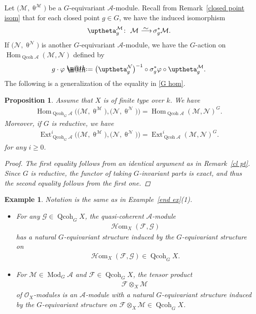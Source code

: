 \documentclass[10pt,a4paper]{amsart}
\makeatletter
\newtheorem{exa}[dfn]{Example}
\newtheorem{prop}[dfn]{Proposition}
\newcommand*{\defeq}{\mathrel{\rlap{%
 \raisebox{0.3ex}{$\m@th\cdot$}}%
 \raisebox{-0.3ex}{$\m@th\cdot$}}%
 =}
\numberwithin{equation}{section}
\newcommand{\Hom}{\operatorname{Hom}}
\newcommand{\cHom}{\operatorname{{\mathcal H}om}}
\newcommand{\Ext}{\operatorname{Ext}}
\newcommand{\Qcoh}{\operatorname{Qcoh}}
\newcommand{\Mod}{\operatorname{Mod}}
\newcommand{\cA}{\mathcal{A}}
\newcommand{\cF}{\mathcal{F}}
\newcommand{\cG}{\mathcal{G}}
\newcommand{\cM}{\mathcal{M}}
\newcommand{\cN}{\mathcal{N}}
\newcommand{\cO}{\mathcal{O}}
\newcommand{\simto}{\,\,\,\,\raisebox{4pt}{$\sim$}{\kern -1.1em \longrightarrow}\,}
\makeatother
\begin{document}
Let $\big(\cM,\uptheta^{\cM}\big)$ be a $G$-equivariant $\cA$-module. Recall from Remark~\ref{closed point isom} that for each closed point $g\in G$, we have the induced isomorphism
\begin{gather*}
\uptheta_g^{\cM}\colon\ \cM\simto \sigma_g^*\cM.
\end{gather*}
If $\big(\cN,\uptheta^{\cN}\big)$ is another $G$-equivariant $\cA$-module, we have the $G$-action on $\Hom_{\Qcoh\cA}(\cM,\cN)$ defined by
\begin{gather*}
g\cdot\varphi\defeq\big(\uptheta^{\cN}_g\big)^{-1}\circ\sigma_g^*\varphi\circ\uptheta^{\cM}_g.
\end{gather*}
The following is a generalization of the equality in \eqref{G hom}.
\begin{prop}\label{G hom 2}
Assume that $X$ is of finite type over $k$. We have
\begin{gather*}
\Hom_{\Qcoh_G\cA}\big(\big(\cM,\uptheta^{\cM}\big),\big(\cN,\uptheta^{\cN}\big)\big) =\Hom_{\Qcoh\cA}(\cM,\cN)^G.
\end{gather*}
Moreover, if $G$ is reductive, we have
\begin{gather*}
\Ext_{\Qcoh_G\cA}^i\big(\big(\cM,\uptheta^{\cM}\big),\big(\cN,\uptheta^{\cN}\big)\big) =\Ext_{\Qcoh\cA}^i(\cM,\cN)^G.
\end{gather*}
for any $i\geq0$.
\begin{proof}
The first equality follows from an identical argument as in Remark~\ref{cl pt}. Since $G$ is reductive, the functor
of taking $G$-invariant parts is exact, and thus the second equality follows from the first one.
\end{proof}
\end{prop}

\begin{exa} %
Notation is the same as in Example~\ref{end ex}(1).

\begin{itemize}\itemsep=0pt
\item[$1.$] For any $\cG\in \Qcoh_GX$, the quasi-coherent $\cA$-module \begin{gather*}\cHom_X(\cF,\cG)\end{gather*} has a natural $G$-equivariant structure induced by the $G$-equivariant structure on
 \begin{gather*}
 \cHom_X(\cF,\cG)\in \Qcoh_GX.
 \end{gather*}


\item[$2.$] For $\cM\in \Mod_G\cA$ and $\cF\in \Qcoh_GX$, the tensor product \begin{gather*}\cF\otimes_X \cM\end{gather*} of $\cO_X$-modules is an $\cA$-module with a natural $G$-equivariant structure induced by the $G$-equivariant structure on $\cF\otimes_X \cM\in \Qcoh_GX$.
\end{itemize}
\end{exa}
\end{document}
